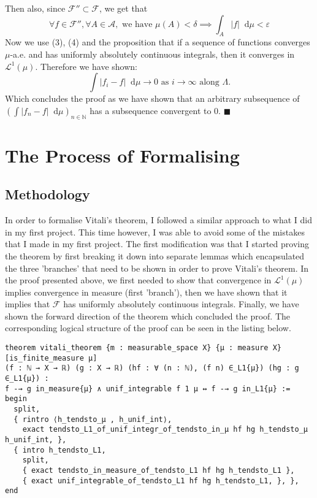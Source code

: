 \documentclass[11pt]{article}
\newenvironment{code}{\captionsetup{type=listing}}{}
\newcommand\N{\mathbb{N}}
\newcommand\Lmu{\mathcal{L}^1(\mu)}
\newcommand\weh{\text{ we have }}
\newcommand\as{\text{ as }}
\newcommand*\diff{\mathop{}\!\mathrm{d}}
\renewcommand\qedsymbol{$\blacksquare$}
\begin{document}
Then also, since $\mathcal{F}'' \subset \mathcal{F}$, we get that
\begin{equation}
\forall f \in \mathcal{F''},
  \forall A \in \mathcal{A}, \weh \mu(A) < \delta \implies \int_A |f|\diff \mu < \varepsilon
\end{equation}
Now we use (3), (4) and the proposition that if a sequence of functions converges $\mu$-a.e.
and has uniformly absolutely continuous integrals, then it converges in  $\Lmu$.
Therefore we have shown:
\[
  \int |f_{i} - f| \diff\mu \to 0 \as i \to \infty \text{ along } \Lambda
.\]
Which concludes the proof as we have shown that an arbitrary subsequence of
$(\int |f_{n} - f| \diff\mu)_{n\in\N} $ has a subsequence convergent to 0. \hfill \qedsymbol

\section*{The Process of Formalising}
\subsection*{Methodology}

In order to formalise Vitali's theorem, I followed a similar approach to what
I did in my first project. This time however, I was able to avoid some of the mistakes that
I made in my first project. The first modification was that I started proving the
theorem by first breaking it down into separate lemmas which encapsulated the
three 'branches' that need to be shown in order to prove Vitali's theorem. In the proof
presented above, we first needed to show that
convergence in $\Lmu$ implies convergence in measure (first 'branch'), then we have shown that
it implies that  $\mathcal{F}$ has uniformly absolutely continuous integrals. Finally,
we have shown the forward direction of the theorem which concluded the proof.
The corresponding logical structure of the proof can be seen in the listing below.

\begin{code}
\begin{verbatim}
theorem vitali_theorem {m : measurable_space X} {μ : measure X} [is_finite_measure μ]
(f : ℕ → X → ℝ) (g : X → ℝ) (hf : ∀ (n : ℕ), (f n) ∈_L1{μ}) (hg : g ∈_L1{μ}) :
f -→ g in_measure{μ} ∧ unif_integrable f 1 μ ↔ f -→ g in_L1{μ} :=
begin
  split,
  { rintro ⟨h_tendsto_μ , h_unif_int⟩,
    exact tendsto_L1_of_unif_integr_of_tendsto_in_μ hf hg h_tendsto_μ  h_unif_int, },
  { intro h_tendsto_L1,
    split,
    { exact tendsto_in_measure_of_tendsto_L1 hf hg h_tendsto_L1 },
    { exact unif_integrable_of_tendsto_L1 hf hg h_tendsto_L1, }, },
end
\end{verbatim}
\end{code}
\end{document}
